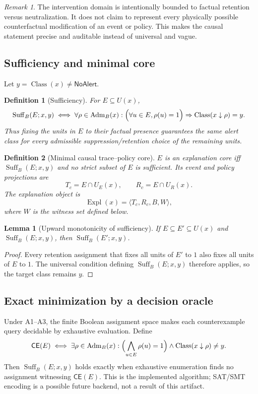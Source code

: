 \documentclass[11pt]{article}
\newtheorem{definition}{Definition}[section]
\newtheorem{lemma}{Lemma}[section]
\theoremstyle{remark}
\newtheorem{remark}{Remark}[section]
\newcommand{\Class}{\operatorname{Class}}
\newcommand{\Expl}{\operatorname{Expl}}
\newcommand{\Suff}{\operatorname{Suff}}
\newcommand{\Adm}{\operatorname{Adm}}
\newcommand{\NoAlert}{\mathsf{NoAlert}}
\begin{document}
\begin{remark}
The intervention domain is intentionally bounded to factual retention versus neutralization. It does not claim to represent every physically possible counterfactual modification of an event or policy. This makes the causal statement precise and auditable instead of universal and vague.
\end{remark}

\subsection{Sufficiency and minimal core}
Let $y=\Class(x)\neq\NoAlert$.

\begin{definition}[Sufficiency]
For $E\subseteq U(x)$,
\[
\Suff_B(E;x,y)\iff
\forall\rho\in\Adm_B(x):
\Bigl(\forall u\in E,\rho(u)=1\Bigr)\Rightarrow \Class(x\downarrow\rho)=y.
\]
Thus fixing the units in $E$ to their factual presence guarantees the \emph{same alert class} for every admissible suppression/retention choice of the remaining units.
\end{definition}

\begin{definition}[Minimal causal trace--policy core]
$E$ is an explanation core iff $\Suff_B(E;x,y)$ and no strict subset of $E$ is sufficient. Its event and policy projections are
\[
T_c=E\cap U_E(x),\qquad R_c=E\cap U_R(x).
\]
The explanation object is
\[
\Expl(x)=\langle T_c,R_c,B,W\rangle,
\]
where $W$ is the witness set defined below.
\end{definition}

\begin{lemma}[Upward monotonicity of sufficiency]\label{lem:upward}
If $E\subseteq E'\subseteq U(x)$ and $\Suff_B(E;x,y)$, then $\Suff_B(E';x,y)$.
\end{lemma}
\begin{proof}
Every retention assignment that fixes all units of $E'$ to $1$ also fixes all units of $E$ to $1$. The universal condition defining $\Suff_B(E;x,y)$ therefore applies, so the target class remains $y$.
\end{proof}

\subsection{Exact minimization by a decision oracle}
Under A1--A3, the finite Boolean assignment space makes each counterexample query decidable by exhaustive evaluation. Define
\[
\mathsf{CE}(E)\iff
\exists\rho\in\Adm_B(x):
\Bigl(\bigwedge_{u\in E}\rho(u)=1\Bigr)\land \Class(x\downarrow\rho)\neq y.
\]
Then $\Suff_B(E;x,y)$ holds exactly when exhaustive enumeration finds no assignment witnessing $\mathsf{CE}(E)$. This is the implemented algorithm; SAT/SMT encoding is a possible future backend, not a result of this artifact.
\end{document}
